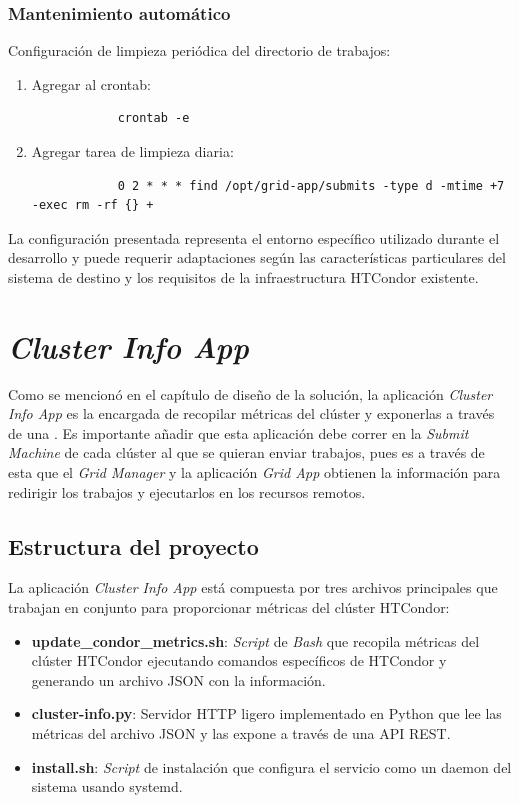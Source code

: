 \subsubsection{Mantenimiento automático}
\noindent

Configuración de limpieza periódica del directorio de trabajos:

\begin{enumerate}
	\item Agregar al crontab:
	      \begin{verbatim}
			crontab -e
		\end{verbatim}
	
	\item Agregar tarea de limpieza diaria:
	      \begin{verbatim}
			0 2 * * * find /opt/grid-app/submits -type d -mtime +7 -exec rm -rf {} +
		\end{verbatim}
\end{enumerate}

La configuración presentada representa el entorno específico utilizado durante el desarrollo y puede requerir adaptaciones según las características particulares del sistema de destino y los requisitos de la infraestructura HTCondor existente.

\section{\textit{Cluster Info App}}
\noindent

Como se mencionó en el capítulo de diseño de la solución, la aplicación \textit{Cluster Info App} es la encargada de recopilar métricas del clúster y exponerlas a través de una \API. Es importante añadir que esta aplicación debe correr en la \textit{Submit Machine} de cada clúster al que se quieran enviar trabajos, pues es a través de esta que el \textit{Grid Manager} y la aplicación \textit{Grid App} obtienen la información para redirigir los trabajos y ejecutarlos en los recursos remotos.

\subsection{Estructura del proyecto}
\noindent
La aplicación \textit{Cluster Info App} está compuesta por tres archivos principales que trabajan en conjunto para proporcionar métricas del clúster HTCondor:

\begin{itemize}
	\item \textbf{update\_condor\_metrics.sh}: \textit{Script} de \textit{Bash} que recopila métricas del clúster HTCondor ejecutando comandos específicos de HTCondor y generando un archivo JSON con la información.
	\item \textbf{cluster-info.py}: Servidor HTTP ligero implementado en Python que lee las métricas del archivo JSON y las expone a través de una API REST.
	\item \textbf{install.sh}: \textit{Script} de instalación que configura el servicio como un daemon del sistema usando systemd.
\end{itemize}

